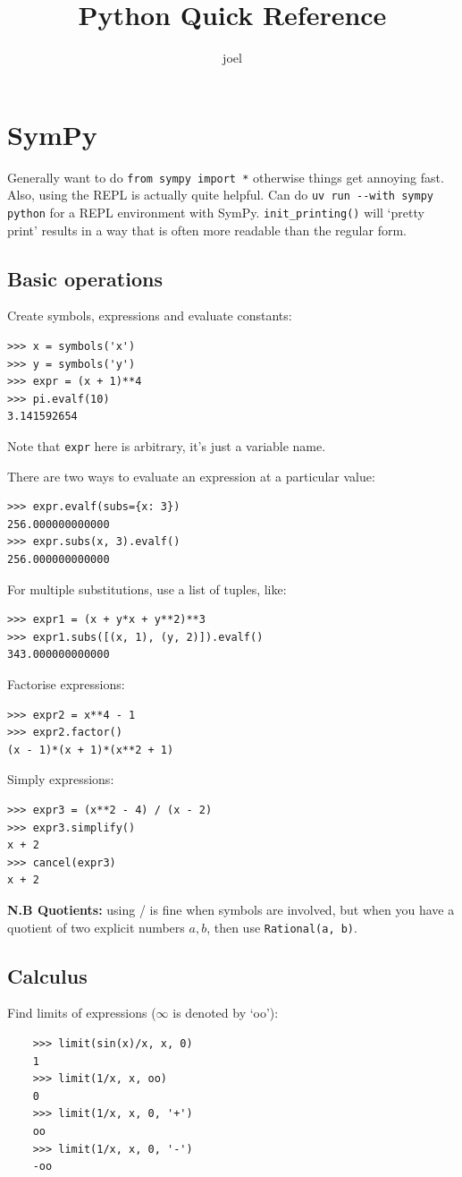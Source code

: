 \documentclass[10pt]{article}
\title{Python Quick Reference}
\author{joel}
\date{}
\theoremstyle{definition}
\theoremstyle{remark}
\begin{document}
\maketitle

\section{SymPy}

Generally want to do \verb|from sympy import *| otherwise things get annoying fast. 
Also, using the REPL is actually quite helpful. 
Can do \verb|uv run --with sympy python| for a REPL environment with SymPy. 
\verb|init_printing()| will `pretty print' results in a way that is often more
readable than the regular form. 
 
\subsection{Basic operations}

Create symbols, expressions and evaluate constants:
\begin{verbatim}
>>> x = symbols('x')
>>> y = symbols('y')
>>> expr = (x + 1)**4       
>>> pi.evalf(10) 
3.141592654
\end{verbatim}
Note that \verb|expr| here is arbitrary, it's just a variable name. 

There are two ways to evaluate an expression at a particular value:
\begin{verbatim}
>>> expr.evalf(subs={x: 3})
256.000000000000
>>> expr.subs(x, 3).evalf()
256.000000000000
\end{verbatim}

For multiple substitutions, use a list of tuples, like:
\begin{verbatim}
>>> expr1 = (x + y*x + y**2)**3
>>> expr1.subs([(x, 1), (y, 2)]).evalf()
343.000000000000
\end{verbatim}

Factorise expressions: 
\begin{verbatim}
>>> expr2 = x**4 - 1
>>> expr2.factor()
(x - 1)*(x + 1)*(x**2 + 1)
\end{verbatim}

Simply expressions: 
\begin{verbatim}
>>> expr3 = (x**2 - 4) / (x - 2)
>>> expr3.simplify()
x + 2
>>> cancel(expr3)
x + 2
\end{verbatim}

\textbf{N.B Quotients:} using / is fine when symbols are involved, but when you have 
a quotient of two explicit numbers $a, b$, then use \verb|Rational(a, b)|. 

\subsection{Calculus} 

Find limits of expressions ($\infty$ is denoted by `oo'): 
\begin{verbatim}
    >>> limit(sin(x)/x, x, 0) 
    1
    >>> limit(1/x, x, oo)
    0
    >>> limit(1/x, x, 0, '+')
    oo
    >>> limit(1/x, x, 0, '-')
    -oo
\end{verbatim}
\end{document}
